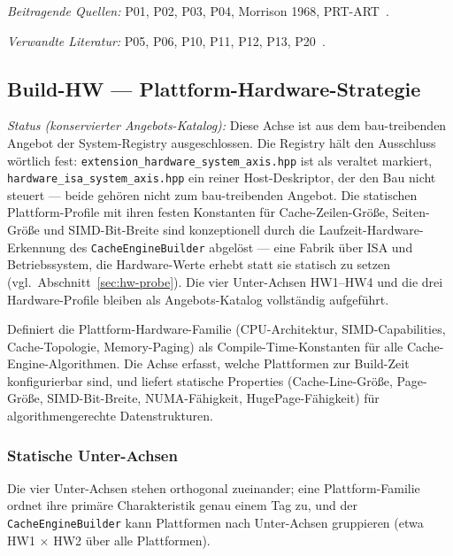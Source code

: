 \emph{Beitragende Quellen:} P01, P02, P03, P04, Morrison 1968, PRT-ART~\cite{leis2013art,binna2018hot,mao2012masstree,boffa2024coco,morrison1968patricia}.

\emph{Verwandte Literatur:} P05, P06, P10, P11, P12, P13, P20~\cite{fent2020start,schmeisser2022b2tree,zhang2018surf,rao1999css,rao2000csb,hankins2003nodesize,mueller2025btreesback}.

\subsection{Build-HW — Plattform-Hardware-Strategie}

\emph{Status (konservierter Angebots-Katalog):} Diese Achse ist aus dem bau-treibenden Angebot der System-Registry ausgeschlossen. Die Registry hält den Ausschluss wörtlich fest: \texttt{extension\_\allowbreak{}hardware\_\allowbreak{}system\_\allowbreak{}axis.hpp} ist als veraltet markiert, \texttt{hardware\_\allowbreak{}isa\_\allowbreak{}system\_\allowbreak{}axis.hpp} ein reiner Host-Deskriptor, der den Bau nicht steuert --- beide gehören nicht zum bau-treibenden Angebot. Die statischen Plattform-Profile mit ihren festen Konstanten für Cache-Zeilen-Größe, Seiten-Größe und SIMD-Bit-Breite sind konzeptionell durch die Laufzeit-Hardware-Erkennung des \texttt{Cache\allowbreak{}Engine\allowbreak{}Builder} abgelöst --- eine Fabrik über ISA und Betriebssystem, die Hardware-Werte erhebt statt sie statisch zu setzen (vgl.\ Abschnitt~\ref{sec:hw-probe}). Die vier Unter-Achsen HW1--HW4 und die drei Hardware-Profile bleiben als Angebots-Katalog vollständig aufgeführt.

Definiert die Plattform-Hardware-Familie (CPU-Architektur, SIMD-Capabilities, Cache-Topologie, Memory-Paging) als Compile-Time-Konstanten für alle Cache-Engine-Algorithmen. Die Achse erfasst, welche Plattformen zur Build-Zeit konfigurierbar sind, und liefert statische Properties (Cache-Line-Größe, Page-Größe, SIMD-Bit-Breite, NUMA-Fähigkeit, Huge\allowbreak{}Page-Fähigkeit) für algorithmengerechte Datenstrukturen.

\subsubsection*{Statische Unter-Achsen}

Die vier Unter-Achsen stehen orthogonal zueinander; eine Plattform-Familie ordnet ihre primäre Charakteristik genau einem Tag zu, und der \texttt{Cache\allowbreak{}Engine\allowbreak{}Builder} kann Plattformen nach Unter-Achsen gruppieren (etwa HW1 $\times$ HW2 über alle Plattformen).

